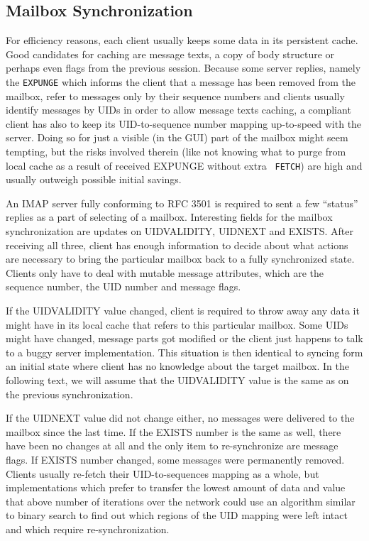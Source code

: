\documentclass[12pt,notitlepage]{report}
\begin{document}
\subsection{Mailbox Synchronization}

For efficiency reasons, each client usually keeps some data in its persistent
cache.  Good candidates for caching are message texts, a copy of body structure or
perhaps even flags from the previous session.  Because some server replies, namely
the {\tt EXPUNGE} which informs the client that a message has been removed from
the mailbox, refer to messages only by their sequence numbers and clients
usually identify messages by UIDs in order to allow message texts caching, a
compliant client has also to keep its UID-to-sequence number mapping up-to-speed
with the server.  Doing so for just a visible (in the GUI) part of the mailbox
might seem tempting, but the risks involved therein (like not knowing what to
purge from local cache as a result of received EXPUNGE without extra {\tt
FETCH}) are high and usually outweigh possible initial savings.

An IMAP server fully conforming to RFC 3501 is required to sent a few ``status''
replies as a part of selecting of a mailbox.  Interesting fields for the mailbox
synchronization are updates on UIDVALIDITY, UIDNEXT and EXISTS.  After receiving
all three, client has enough information to decide about what actions are
necessary to bring the particular mailbox back to a fully synchronized state.
Clients only have to deal with mutable message attributes, which are the
sequence number, the UID number and message flags.

If the UIDVALIDITY value changed, client is required to throw away any data it
might have in its local cache that refers to this particular mailbox.  Some UIDs
might have changed, message parts got modified or the client just happens to
talk to a buggy server implementation.  This situation is then identical to
syncing form an initial state where client has no knowledge about the target
mailbox. In the following text, we will assume that the UIDVALIDITY value is the
same as on the previous synchronization.

If the UIDNEXT value did not change either, no messages were delivered to the
mailbox since the last time.  If the EXISTS number is the same as well, there
have been no changes at all and the only item to re-synchronize are message
flags.  If EXISTS number changed, some messages were permanently removed.
Clients usually re-fetch their UID-to-sequences mapping as a whole, but
implementations which prefer to transfer the lowest amount of data and value
that above number of iterations over the network could use an algorithm similar
to binary search to find out which regions of the UID mapping were left intact
and which require re-synchronization.
\end{document}
